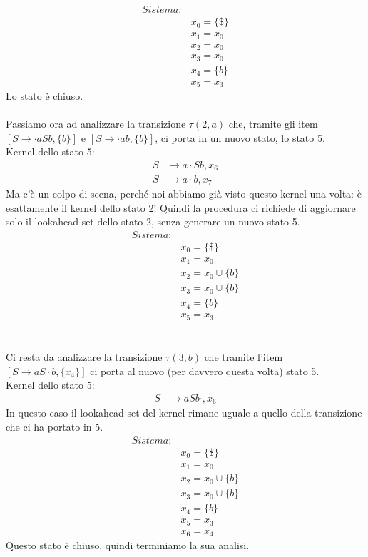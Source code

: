 \documentclass[class=book, crop=false, oneside, 12pt]{standalone}
\begin{document}
\begin{align*}
    Sistema:& \\
            & x_0 = \{\$\}\\
            & x_1 = x_0 \\
            & x_2 = x_0 \\
            & x_3 = x_0 \\
            & x_4 = \{b\} \\
            & x_5 = x_3 
\end{align*}
Lo stato è chiuso.
\\\\
Passiamo ora ad analizzare la transizione \(\tau(2,a)\) che, tramite gli item \([S \to  \cdot a S b, \{b\}]\) e \([S \to  \cdot a b, \{b\}]\), ci porta in un nuovo stato, lo stato 5.
\\
Kernel dello stato 5:
\begin{align*}
    S &\to a \cdot S b, x_6 \\
    S &\to a \cdot b, x_7
\end{align*}
Ma c'è un colpo di scena, perché noi abbiamo già visto questo kernel una volta: è esattamente il kernel dello stato 2!
Quindi la procedura ci richiede di aggiornare solo il lookahead set dello stato 2, senza generare un nuovo stato 5.
\begin{align*}
    Sistema:& \\
            & x_0 = \{\$\}\\
            & x_1 = x_0 \\
            & x_2 = x_0 \cup \{b\} \\
            & x_3 = x_0 \cup \{b\} \\
            & x_4 = \{b\} \\
            & x_5 = x_3
\end{align*}
\\\\
Ci resta da analizzare la transizione \(\tau(3,b)\) che tramite l'item \([S \to a S \cdot b, \{x_4\}]\) ci porta al nuovo (per davvero questa volta) stato 5.
\\
Kernel dello stato 5:
\begin{align*}
    S &\to a S b \cdot, x_6
\end{align*}
In questo caso il lookahead set del kernel rimane uguale a quello della transizione che ci ha portato in 5.
\begin{align*}
    Sistema:& \\
            & x_0 = \{\$\}\\
            & x_1 = x_0 \\
            & x_2 = x_0 \cup \{b\} \\
            & x_3 = x_0 \cup \{b\} \\
            & x_4 = \{b\} \\
            & x_5 = x_3 \\
            & x_6 = x_4
\end{align*}
Questo stato è chiuso, quindi terminiamo la sua analisi.
\end{document}
